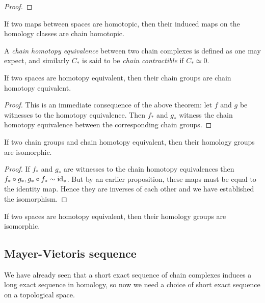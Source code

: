 \begin{proof}
\end{proof}

\begin{corollary}
	If two maps between spaces are homotopic, then their induced maps on the homology classes are chain homotopic.
\end{corollary}

A \emph{chain homotopy equivalence} between two chain complexes is defined as one may expect, and similarly $C_*$ is said to be \emph{chain contractible} if $C_* \simeq 0$.

\begin{lemma}
	If two spaces are homotopy equivalent, then their chain groups are chain homotopy equivalent.
\end{lemma}

\begin{proof}
	This is an immediate consequence of the above theorem: let $f$ and $g$ be witnesses to the homotopy equivalence. Then $f_*$ and $g_*$ witness the chain homotopy equivalence between the corresponding chain groups.
\end{proof}

\begin{lemma}
	If two chain groups and chain homotopy equivalent, then their homology groups are isomorphic.
\end{lemma}

\begin{proof}
	If $f_*$ and $g_*$ are witnesses to the chain homotopy equivalences then $f_* \circ g_*, g_* \circ f_* \sim \operatorname{id}_*$. But by an earlier proposition, these maps must be equal to the identity map. Hence they are inverses of each other and we have established the isomorphism.
\end{proof}

\begin{corollary}
	If two spaces are homotopy equivalent, then their homology groups are isomorphic.
\end{corollary}

\subsection{Mayer-Vietoris sequence}

We have already seen that a short exact sequence of chain complexes induces a long exact sequence in homology, so now we need a choice of short exact sequence on a topological space.

